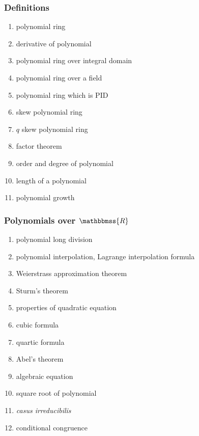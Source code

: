 \documentclass[12pt]{article}
\newcommand{\R}{\mathbbmss{R}}
\begin{document}
\subsubsection*{Definitions}
\begin{enumerate}
\item polynomial ring 
\item derivative of polynomial
\item polynomial ring over integral domain
\item polynomial ring over a field
\item polynomial ring which is PID
\item skew polynomial ring
\item $q$ skew polynomial ring
\item factor theorem
\item order and degree of polynomial
\item length of a polynomial
\item polynomial growth
\end{enumerate}

\subsubsection*{Polynomials over $\R$}
\begin{enumerate}
\item polynomial long division
\item polynomial interpolation, Lagrange interpolation formula
\item Weierstrass approximation theorem
\item Sturm's theorem 
\item properties of quadratic equation 
\item cubic formula 
\item quartic formula 
\item Abel's theorem
\item algebraic equation
\item square root of polynomial
\item {\em casus irreducibilis}
\item conditional congruence
\end{enumerate}
\end{document}
